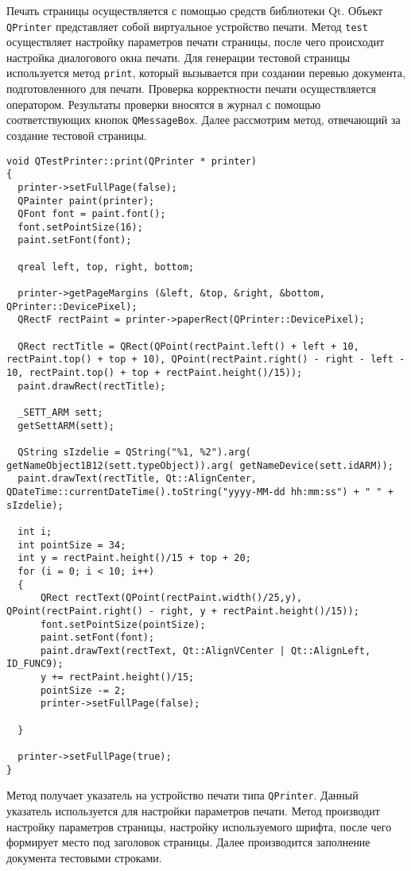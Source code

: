 Печать страницы осуществляется с помощью средств библиотеки Qt. Объект \texttt{QPrinter} представляет собой виртуальное
устройство печати. Метод \texttt{test} осуществляет настройку параметров печати страницы, после чего происходит
настройка диалогового окна печати. Для генерации тестовой страницы используется метод \texttt{print}, который вызывается
при создании перевью документа, подготовленного для печати. Проверка корректности печати осуществляется оператором.
Результаты проверки вносятся в журнал с помощью соответствующих кнопок \texttt{QMessageBox}. Далее рассмотрим метод,
отвечающий за создание тестовой страницы.
\medskip
\begin{verbatim}
void QTestPrinter::print(QPrinter * printer)
{
  printer->setFullPage(false);
  QPainter paint(printer);
  QFont font = paint.font();
  font.setPointSize(16);
  paint.setFont(font);

  qreal left, top, right, bottom;

  printer->getPageMargins (&left, &top, &right, &bottom, QPrinter::DevicePixel);
  QRectF rectPaint = printer->paperRect(QPrinter::DevicePixel);

  QRect rectTitle = QRect(QPoint(rectPaint.left() + left + 10, rectPaint.top() + top + 10), QPoint(rectPaint.right() - right - left - 10, rectPaint.top() + top + rectPaint.height()/15));
  paint.drawRect(rectTitle);

  _SETT_ARM sett;
  getSettARM(sett);

  QString sIzdelie = QString("%1, %2").arg( getNameObject1B12(sett.typeObject)).arg( getNameDevice(sett.idARM));
  paint.drawText(rectTitle, Qt::AlignCenter, QDateTime::currentDateTime().toString("yyyy-MM-dd hh:mm:ss") + " " + sIzdelie);

  int i;
  int pointSize = 34;
  int y = rectPaint.height()/15 + top + 20;
  for (i = 0; i < 10; i++)
  {
	  QRect rectText(QPoint(rectPaint.width()/25,y), QPoint(rectPaint.right() - right, y + rectPaint.height()/15));
	  font.setPointSize(pointSize);
	  paint.setFont(font);
	  paint.drawText(rectText, Qt::AlignVCenter | Qt::AlignLeft, ID_FUNC9);
	  y += rectPaint.height()/15;
	  pointSize -= 2;
	  printer->setFullPage(false);

  }

  printer->setFullPage(true);
}

\end{verbatim}
\medskip

Метод получает указатель на устройство печати типа \texttt{QPrinter}. Данный указатель используется для настройки
параметров печати. Метод производит настройку параметров страницы, настройку используемого шрифта, после чего формирует
место под заголовок страницы. Далее производится заполнение документа тестовыми строками.

